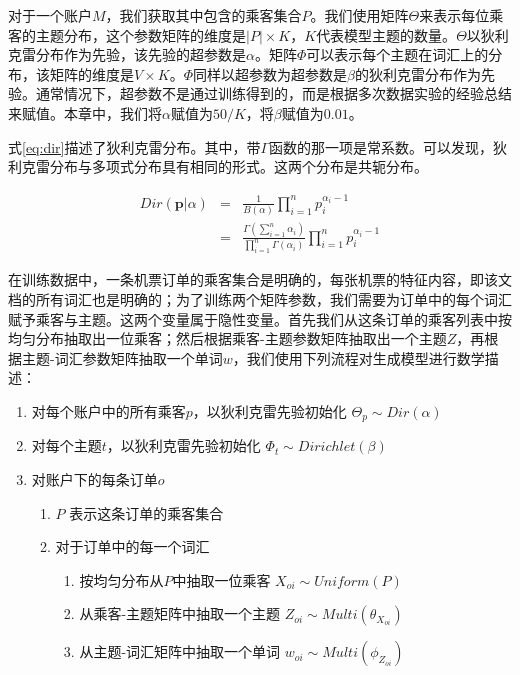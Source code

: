 对于一个账户$M$，我们获取其中包含的乘客集合$P$。我们使用矩阵$\Theta$来表示每位乘客的主题分布，这个参数矩阵的维度是$|P| \times K$，$K$代表模型主题的数量。$\Theta$以狄利克雷分布作为先验，该先验的超参数是$\alpha$。矩阵$\Phi$可以表示每个主题在词汇上的分布，该矩阵的维度是$V \times K$。$\Phi$同样以超参数为超参数是$\beta$的狄利克雷分布作为先验。通常情况下，超参数不是通过训练得到的，而是根据多次数据实验的经验总结来赋值。本章中，我们将$\alpha$赋值为$50/K$，将$\beta$赋值为$0.01$。

式\ref{eq:dir}描述了狄利克雷分布。其中，带$\Gamma$函数的那一项是常系数。可以发现，狄利克雷分布与多项式分布具有相同的形式。这两个分布是共轭分布。

\begin{eqnarray}
\label{eq:dir}
	Dir(\mathbf{p}|\alpha) & = & \frac{1}{B(\alpha)}\prod_{i=1}^n p_i^{\alpha_i-1} \nonumber \\
	& = & \frac{\Gamma(\sum_{i=1}^n \alpha_i)}{\prod_{i=1}^n \Gamma(\alpha_i)}\prod_{i=1}^n p_i^{\alpha_i-1}
\end{eqnarray}

在训练数据中，一条机票订单的乘客集合是明确的，每张机票的特征内容，即该文档的所有词汇也是明确的；为了训练两个矩阵参数，我们需要为订单中的每个词汇赋予乘客与主题。这两个变量属于隐性变量。首先我们从这条订单的乘客列表中按均匀分布抽取出一位乘客；然后根据乘客-主题参数矩阵抽取出一个主题$Z$，再根据主题-词汇参数矩阵抽取一个单词$w$，我们使用下列流程对生成模型进行数学描述：

\begin{enumerate}
\item 对每个账户中的所有乘客$p$，以狄利克雷先验初始化 $\Theta_p \sim Dir(\alpha)$
\item 对每个主题$t$，以狄利克雷先验初始化 $\Phi_t \sim Dirichlet(\beta)$
\item 对账户下的每条订单$o$
       \begin{enumerate}[fullwidth,itemindent=1em,label=(\alph*)]
       \item $P$ 表示这条订单的乘客集合
       \item 对于订单中的每一个词汇
              \begin{enumerate}[fullwidth,itemindent=2em,label=(\roman*)]
              \item 按均匀分布从$P$中抽取一位乘客 $X_{oi} \sim Uniform(P)$
              \item 从乘客-主题矩阵中抽取一个主题 $Z_{oi} \sim Multi(\theta_{X_{oi}})$
              \item 从主题-词汇矩阵中抽取一个单词 $w_{oi} \sim Multi(\phi_{Z_{oi}})$
              \end{enumerate}
       \end{enumerate}
\end{enumerate}


